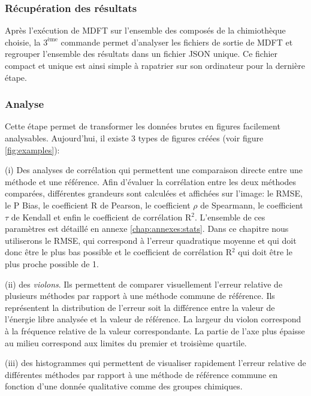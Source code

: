 \subsubsection{Récupération des résultats}
Après l’exécution de MDFT sur l'ensemble des composés de la chimiothèque choisie, la $3^\text{ème}$ commande permet d'analyser les fichiers de sortie de MDFT et regrouper l'ensemble des résultats dans un fichier JSON unique. Ce fichier compact et unique est ainsi simple à rapatrier sur son ordinateur pour la dernière étape.


\subsubsection{Analyse}
Cette étape permet de transformer les données brutes en figures facilement analysables. Aujourd'hui, il existe 3 types de figures créées (voir figure \ref{fig:examples}):

(i) Des analyses de corrélation qui permettent une comparaison directe entre une méthode et une référence. Afin d'évaluer la corrélation entre les deux méthodes comparées, différentes grandeurs sont calculées et affichées sur l'image: le RMSE, le P Bias, le coefficient R de Pearson, le coefficient $\rho$ de Spearmann, le coefficient $\tau$ de Kendall et enfin le coefficient de corrélation R$^2$. L'ensemble de ces paramètres est détaillé en annexe \ref{chap:annexes:stats}. Dans ce chapitre nous utiliserons le RMSE, qui correspond à l'erreur quadratique moyenne et qui doit donc être le plus bas possible et le coefficient de corrélation R$^2$ qui doit être le plus proche possible de 1.

(ii) des \textit{violons}. Ils permettent de comparer visuellement l'erreur relative de plusieurs méthodes par rapport à une méthode commune de référence. Ils représentent la distribution de l'erreur soit la différence entre la valeur de l'énergie libre analysée et la valeur de référence. La largeur du violon correspond à la fréquence relative de la valeur correspondante. La partie de l'axe plus épaisse au milieu correspond aux limites du premier et troisième quartile.


(iii) des histogrammes qui permettent de visualiser rapidement l'erreur relative de différentes méthodes par rapport à une méthode de référence commune en fonction d'une donnée qualitative comme des groupes chimiques.







